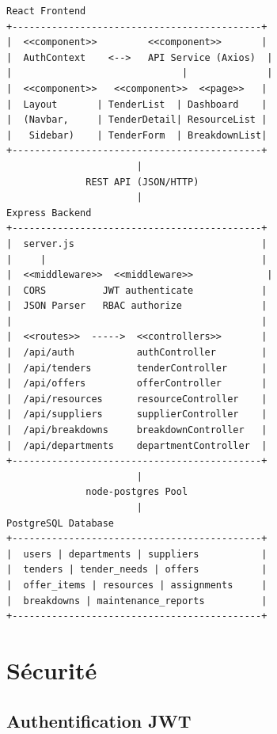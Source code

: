 \begin{verbatim}
React Frontend
+--------------------------------------------+
|  <<component>>         <<component>>       |
|  AuthContext    <-->   API Service (Axios)  |
|                              |              |
|  <<component>>   <<component>>  <<page>>   |
|  Layout       | TenderList  | Dashboard    |
|  (Navbar,     | TenderDetail| ResourceList |
|   Sidebar)    | TenderForm  | BreakdownList|
+--------------------------------------------+
                       |
              REST API (JSON/HTTP)
                       |
Express Backend
+--------------------------------------------+
|  server.js                                 |
|     |                                      |
|  <<middleware>>  <<middleware>>             |
|  CORS          JWT authenticate            |
|  JSON Parser   RBAC authorize              |
|                                            |
|  <<routes>>  ----->  <<controllers>>       |
|  /api/auth           authController        |
|  /api/tenders        tenderController      |
|  /api/offers         offerController       |
|  /api/resources      resourceController    |
|  /api/suppliers      supplierController    |
|  /api/breakdowns     breakdownController   |
|  /api/departments    departmentController  |
+--------------------------------------------+
                       |
              node-postgres Pool
                       |
PostgreSQL Database
+--------------------------------------------+
|  users | departments | suppliers           |
|  tenders | tender_needs | offers           |
|  offer_items | resources | assignments     |
|  breakdowns | maintenance_reports          |
+--------------------------------------------+
\end{verbatim}

\section{Sécurité}

\subsection{Authentification JWT}

